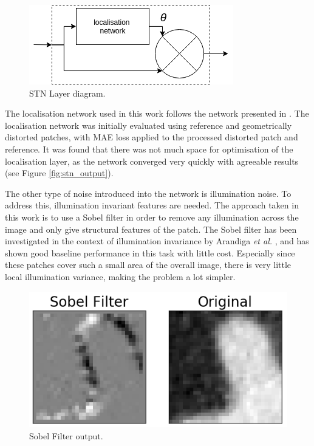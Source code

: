 \documentclass[10pt,twocolumn,letterpaper]{article}
\begin{document}
\begin{figure}[H]
\centering
  \includegraphics[width=0.7\linewidth]{report/figures/stn_network.png}
  \caption{STN Layer diagram.}
  \label{fig:stn_diagram}
\end{figure}

The localisation network used in this work follows the network presented in \cite{jaderberg2015spatial}. 
The localisation network was initially evaluated using reference and geometrically distorted patches, with MAE loss applied to the processed distorted patch and reference.
It was found that there was not much space for optimisation of the localisation layer, as the network converged very quickly with agreeable results (see Figure \ref{fig:stn_output}).


The other type of noise introduced into the network is illumination noise. To address this, illumination invariant features are needed. The approach taken in this work is to use a Sobel filter \cite{sobel_filter} in order to remove any illumination across the image and only give structural features of the patch.  The Sobel filter has been investigated in the context of illumination invariance by Arandiga \textit{et al.} \cite{Arandiga2010}, and has shown good baseline performance in this task with little cost. Especially since these patches cover such a small area of the overall image, there is very little local illumination variance, making the problem a lot simpler. 

\begin{figure}[H]
\centering
  \includegraphics[width=0.55\linewidth]{report/figures/sobel_filter.png}
  \caption{Sobel Filter output.}
  \label{fig:sobel_filter_output}
\end{figure}
\end{document}
